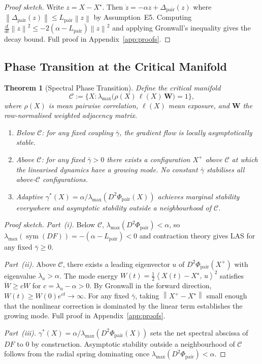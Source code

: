 \documentclass[11pt]{article}
\newtheorem{theorem}{Theorem}[section]
\theoremstyle{definition}
\DeclareMathOperator{\sym}{sym}
\newcommand{\Xst}{X^{\star}}
\newcommand{\Cman}{\mathcal{C}}
\newcommand{\Lpair}{L_{\mathrm{pair}}}
\newcommand{\lmax}{\lambda_{\max}}
\newcommand{\norm}[1]{\left\|#1\right\|}
\newcommand{\inner}[2]{\left\langle #1,\, #2\right\rangle}
\begin{document}
\begin{proof}[Proof sketch]
Write $z = X - \Xst$.  Then $\dot z = -\alpha z + \Delta_{\mathrm{pair}}(z)$ where
$\norm{\Delta_{\mathrm{pair}}(z)} \le \Lpair\norm{z}$ by Assumption~E5.
Computing $\frac{d}{dt}\norm{z}^2 \le -2(\alpha-\Lpair)\norm{z}^2$
and applying Gronwall's inequality gives the decay bound.
Full proof in Appendix~\ref{app:proofs}.
\end{proof}

\subsection{Phase Transition at the Critical Manifold}

\begin{theorem}[Spectral Phase Transition]
\label{thm:phase}
Define the critical manifold
\[
  \Cman := \bigl\{X : \lmax\bigl(\rho(X)\,\ell(X)\,\mathbf{W}\bigr) = 1\bigr\},
\]
where $\rho(X)$ is mean pairwise correlation, $\ell(X)$ mean exposure, and
$\mathbf{W}$ the row-normalised weighted adjacency matrix.
\begin{enumerate}
\item[(\textup{i})] Below $\Cman$: for any fixed coupling $\bar\gamma$,
  the gradient flow is locally asymptotically stable.
\item[(\textup{ii})] Above $\Cman$: for any fixed $\bar\gamma > 0$ there exists
  a configuration $X^+$ above $\Cman$ at which the linearised dynamics have a
  growing mode.  No constant $\bar\gamma$ stabilises all above-$\Cman$ configurations.
\item[(\textup{iii})] Adaptive $\gamma^*(X) = \alpha/\lmax(D^2\Phi_{\mathrm{pair}}(X))$
  achieves marginal stability everywhere and asymptotic stability outside a
  neighbourhood of $\Cman$.
\end{enumerate}
\end{theorem}

\begin{proof}[Proof sketch]
\textit{Part~(i).}  Below $\Cman$, $\lmax(D^2\Phi_{\mathrm{pair}}) < \alpha$, so
$\lmax(\sym(DF)) = -(\alpha - \Lpair) < 0$ and contraction theory
\citep{lohmiller1998contraction} gives LAS for any fixed $\bar\gamma \ge 0$.

\textit{Part~(ii).}  Above $\Cman$, there exists a leading eigenvector $u$ of
$D^2\Phi_{\mathrm{pair}}(X^+)$ with eigenvalue $\lambda_u > \alpha$.  The mode
energy $W(t) = \tfrac{1}{2}\inner{X(t)-\Xst}{u}^2$ satisfies $\dot W \ge c W$
for $c = \lambda_u - \alpha > 0$.  By Gronwall in the forward direction,
$W(t) \ge W(0)e^{ct} \to \infty$.  For any fixed $\bar\gamma$, taking
$\norm{X^+ - \Xst}$ small enough that the nonlinear correction is dominated
by the linear term establishes the growing mode.  Full proof in
Appendix~\ref{app:proofs}.

\textit{Part~(iii).}  $\gamma^*(X) = \alpha/\lmax(D^2\Phi_{\mathrm{pair}}(X))$ sets
the net spectral abscissa of $DF$ to $0$ by construction.  Asymptotic stability
outside a neighbourhood of $\Cman$ follows from the radial spring dominating
once $\lmax(D^2\Phi_{\mathrm{pair}}) < \alpha$.
\end{proof}
\end{document}
